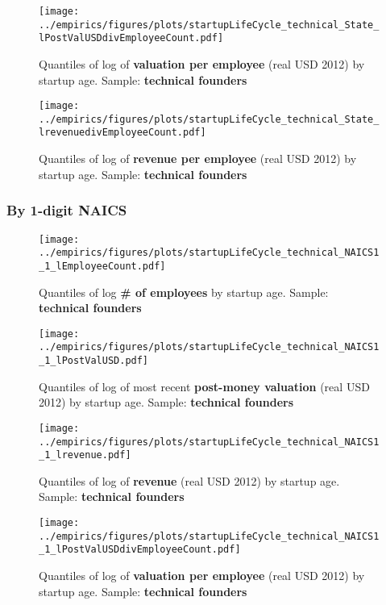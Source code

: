 \documentclass[12pt,english]{article}
\theoremstyle{remark}
\let\Oldsubsubsection\subsubsection
\renewcommand{\subsubsection}{\FloatBarrier\Oldsubsubsection}
\begin{document}
\begin{figure}[!htb]
	\centering
	\texttt{[image: ../empirics/figures/plots/startupLifeCycle\_technical\_State\_lPostValUSDdivEmployeeCount.pdf]}
	\caption{Quantiles of log of \textbf{valuation per employee} (real USD 2012) by startup age. 
		Sample: \textbf{technical founders}}
\end{figure}

\begin{figure}[!htb]
	\centering
	\texttt{[image: ../empirics/figures/plots/startupLifeCycle\_technical\_State\_lrevenuedivEmployeeCount.pdf]}
	\caption{Quantiles of log of \textbf{revenue per employee} (real USD 2012) by startup age. 
		Sample: \textbf{technical founders}}
\end{figure}

\subsubsection{By 1-digit NAICS}

\begin{figure}[!htb]
	\centering
	\texttt{[image: ../empirics/figures/plots/startupLifeCycle\_technical\_NAICS1\_1\_lEmployeeCount.pdf]}
	\caption{Quantiles of log \textbf{\# of employees} by startup age. 
		Sample: \textbf{technical founders}}
\end{figure}

\begin{figure}[!htb]
	\centering
	\texttt{[image: ../empirics/figures/plots/startupLifeCycle\_technical\_NAICS1\_1\_lPostValUSD.pdf]}
	\caption{Quantiles of log of most recent \textbf{post-money valuation} (real USD 2012) by startup age. 
		Sample: \textbf{technical founders}}
\end{figure}

\begin{figure}[!htb]
	\centering
	\texttt{[image: ../empirics/figures/plots/startupLifeCycle\_technical\_NAICS1\_1\_lrevenue.pdf]}
	\caption{Quantiles of log of \textbf{revenue} (real USD 2012) by startup age. 
		Sample: \textbf{technical founders}}
\end{figure}

\begin{figure}[!htb]
	\centering
	\texttt{[image: ../empirics/figures/plots/startupLifeCycle\_technical\_NAICS1\_1\_lPostValUSDdivEmployeeCount.pdf]}
	\caption{Quantiles of log of \textbf{valuation per employee} (real USD 2012) by startup age. 
		Sample: \textbf{technical founders}}
\end{figure}
\end{document}
